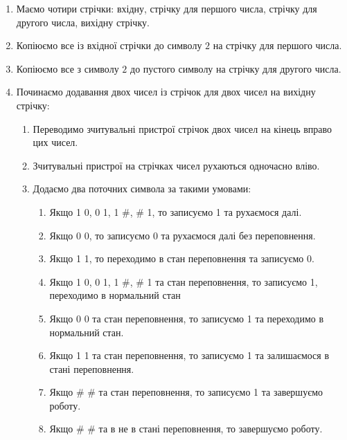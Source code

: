 \documentclass[12pt,letterpaper]{article}
\begin{document}
\begin{enumerate}
    \item Маємо чотири стрічки: вхідну, стрічку для першого числа, стрічку для
        другого числа, вихідну стрічку.
    \item Копіюємо все із вхідної стрічки до символу $2$ на стрічку для першого числа.
    \item Копіюємо все з символу $2$ до пустого символу на стрічку для другого числа.
    \item Починаємо додавання двох чисел із стрічок для двох чисел на вихідну стрічку:
        \begin{enumerate}
            \item Переводимо зчитувальні пристрої стрічок двох чисел на кінець вправо
                цих чисел.
            \item Зчитувальні пристрої на стрічках чисел рухаються одночасно вліво.
            \item Додаємо два поточних символа за такими умовами:
                \begin{enumerate}
                    \item Якщо 1 0, 0 1, 1 \#, \# 1, то записуємо 1 та рухаємося далі.
                    \item Якщо 0 0, то записуємо 0 та рухаємося далі без переповнення.
                    \item Якщо 1 1, то переходимо в стан переповнення та записуємо 0.
                    \item Якщо 1 0, 0 1, 1 \#, \# 1 та стан переповнення, то
                        записуємо 1, переходимо в нормальний стан
                    \item Якщо 0 0 та стан переповнення, то записуємо 1 та переходимо
                        в нормальний стан.
                    \item Якщо 1 1 та стан переповнення, то записуємо 1 та залишаємося
                        в стані переповнення.
                    \item Якщо \# \# та стан переповнення, то записуємо 1 та завершуємо роботу.
                    \item Якщо \# \# та в не в стані переповнення, то завершуємо роботу.
                \end{enumerate}
        \end{enumerate}
\end{enumerate}

\end{document}
